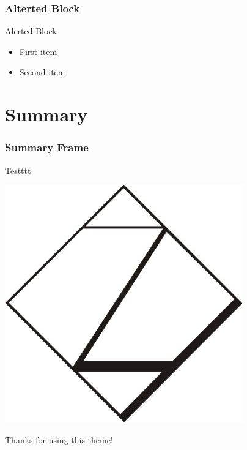 \documentclass{beamer}
\begin{document}
\begin{frame}[fragile]
  \frametitle{Alterted Block}
  \begin{alertblock}{Alerted Block}
    \begin{itemize}
      \item First item
      \item Second item
    \end{itemize}
  \end{alertblock}
\end{frame}

\section{Summary}

\begin{frame}
  \frametitle{Summary Frame}
Testttt
  \begin{center}
    \includegraphics{../images/logo-whz.jpg}

    Thanks for using this theme!
  \end{center}
\end{frame}
\end{document}
